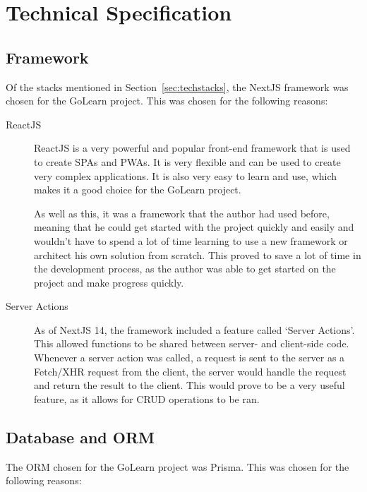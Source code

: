 \documentclass[11pt, a4paper,twoside]{report}
\theoremstyle{plain} %
\theoremstyle{definition} %
\numberwithin{equation}{chapter}
\begin{document}
\chapter{Technical Specification}\label{ch:techspec}

\section{Framework}\label{sec:framework}

Of the stacks mentioned in Section~\ref{sec:techstacks}, the NextJS framework
was chosen for the GoLearn project. This was chosen for the following reasons:

\begin{description}
    \item[ReactJS\cite{what-is-react}] {
        ReactJS is a very powerful and popular front-end framework that is
        used to create SPAs and PWAs. It is very flexible and can be used to
        create very complex applications. It is also very easy to learn and
        use, which makes it a good choice for the GoLearn project.

        As well as this, it was a framework that the author had used before,
        meaning that he could get started with the project quickly and easily
        and wouldn't have to spend a lot of time learning to use a new
        framework or architect his own solution from scratch. This proved to
        save a lot of time in the development process, as the author was able
        to get started on the project and make progress quickly.
        }
    \item[Server Actions\cite{next-server-action}] {
        As of NextJS 14, the framework included a feature called `Server
        Actions'. This allowed functions to be shared between server- and
        client-side code. Whenever a server action was called, a request is
        sent to the server as a Fetch/XHR request from the client, the server
        would handle the request and return the result to the client. This
        would prove to be a very useful feature, as it allows for CRUD
        operations to be ran.
        }
\end{description}

\section{Database and ORM}\label{sec:databaseorm}

The ORM chosen for the GoLearn project was Prisma. This was chosen for the
following reasons:
\end{document}

